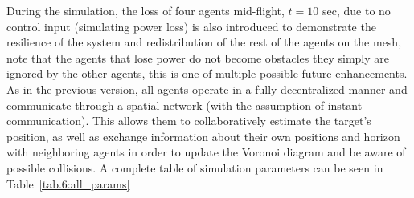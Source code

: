 During the simulation, the loss of four agents mid-flight, $t = 10$ sec, due to no control input (simulating power loss) is also introduced to demonstrate the resilience of the system and redistribution of the rest of the agents on the mesh, note that the agents that lose power do not become obstacles they simply are ignored by the other agents, this is one of multiple possible future enhancements. As in the previous version, all agents operate in a fully decentralized manner and communicate through a spatial network (with the assumption of instant communication). This allows them to collaboratively estimate the target's position, as well as exchange information about their own positions and horizon with neighboring agents in order to update the Voronoi diagram and be aware of possible collisions. A complete table of simulation parameters can be seen in Table~\ref{tab.6:all_params}

